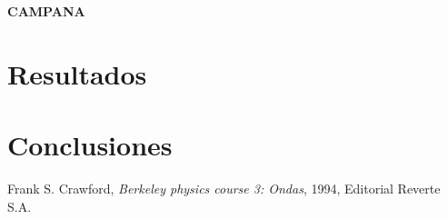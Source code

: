 \documentclass[11pt,a4paper]{article}
\begin{document}
\textbf{CAMPANA}


\section{Resultados}
\label{sec:discusion}



\section{Conclusiones}
\label{sec:conclusiones}







\begin{thebibliography}{1}
  Frank S. Crawford, \textit{Berkeley physics course 3: Ondas}, 1994, Editorial Reverte S.A.
\end{thebibliography}
 
\end{document}
